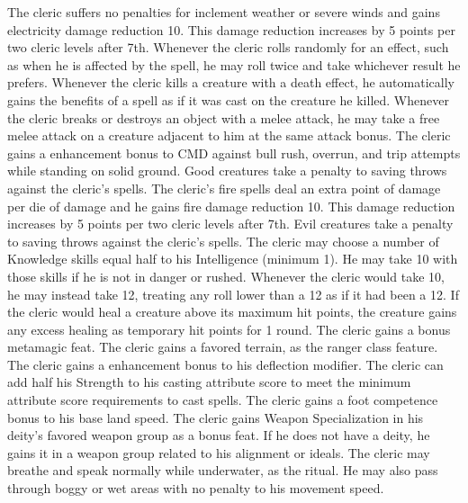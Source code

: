  The cleric suffers no penalties for inclement weather or severe winds and gains electricity damage reduction 10. This damage reduction increases by 5 points per two cleric levels after 7th.
 Whenever the cleric rolls randomly for an effect, such as when he is affected by the  spell, he may roll twice and take whichever result he prefers.
 Whenever the cleric kills a creature with a death effect, he automatically gains the benefits of a  spell as if it was cast on the creature he killed.
 Whenever the cleric breaks or destroys an object with a melee attack, he may take a free melee attack on a creature adjacent to him at the same attack bonus.
 The cleric gains a  enhancement bonus to CMD against bull rush, overrun, and trip attempts while standing on solid ground.
 Good creatures take a  penalty to saving throws against the cleric's spells.
 The cleric's fire spells deal an extra point of damage per die of damage and he gains fire damage reduction 10. This damage reduction increases by 5 points per two cleric levels after 7th.
 Evil creatures take a  penalty to saving throws against the cleric's spells.
 The cleric may choose a number of Knowledge skills equal half to his Intelligence (minimum 1). He may take 10 with those skills if he is not in danger or rushed.
 Whenever the cleric would take 10, he may instead take 12, treating any roll lower than a 12 as if it had been a 12.
 If the cleric would heal a creature above its maximum hit points, the creature gains any excess healing as temporary hit points for 1 round.
 The cleric gains a bonus metamagic feat.
 The cleric gains a favored terrain, as the ranger class feature.
 The cleric gains a  enhancement bonus to his deflection modifier.
 The cleric can add half his Strength to his casting attribute score to meet the minimum attribute score requirements to cast spells.
 The cleric gains a  foot competence bonus to his base land speed.
 The cleric gains Weapon Specialization in his deity's favored weapon group as a bonus feat. If he does not have a deity, he gains it in a weapon group related to his alignment or ideals.
 The cleric may breathe and speak normally while underwater, as the  ritual. He may also pass through boggy or wet areas with no penalty to his movement speed.

